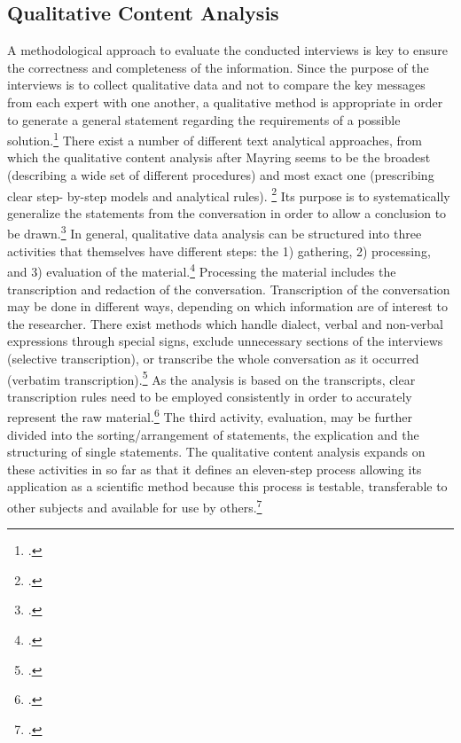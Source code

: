 \subsection{Qualitative Content Analysis} \label{subsec:Mayring}
A methodological approach to evaluate the conducted interviews is key to ensure the correctness and completeness of the information. Since the purpose of the interviews is to collect qualitative data and not to compare the key messages from each expert with one another, a qualitative method is appropriate in order to generate a general statement regarding the requirements of a possible solution.\footcite[Cf.][p.456]{MeuserExpertInneninterviewsvielfacherprobt1991} There exist a number of different text analytical approaches, from which the qualitative content analysis after Mayring seems to be the broadest (describing a wide set of different procedures) and most exact one (prescribing clear step- by-step models and analytical rules). \footcite[Cf.][p.197]{SteiglederstrukturierendequalitativeInhaltsanalyse2008} Its purpose is to systematically generalize the statements from the conversation in order to allow a conclusion to be drawn.\footcite[Cf.][p.13]{MayringQualitativeContentAnalysis2014}
In general, qualitative data analysis can be structured into three activities that themselves have different steps: the 1) gathering, 2) processing, and 3) evaluation of the material.\footcite[Cf.][p.135 et seqq]{KrugerqualitativeInhaltsanalyseMethode2004} Processing the material includes the transcription and redaction of the conversation. Transcription of the conversation may be done in different ways, depending on which information are of interest to the researcher. There exist methods which handle dialect, verbal and non-verbal expressions through special signs, exclude unnecessary sections of the interviews (selective transcription), or transcribe the whole conversation as it occurred (verbatim transcription).\footcite[Cf.][p.44 et seq]{MayringQualitativeContentAnalysis2014} As the analysis is based on the transcripts, clear transcription rules need to be employed consistently in order to accurately represent the raw material.\footcite[Cf.][p.44]{MayringQualitativeContentAnalysis2014} The third activity, evaluation, may be further divided into the sorting/arrangement of statements, the explication and the structuring of single statements. The qualitative content analysis expands on these activities in so far as that it defines an eleven-step process allowing its application as a scientific method because this process is testable, transferable to other subjects and available for use by others.\footcite[Cf.][p.53]{MayringQualitativeContentAnalysis2014}
 
